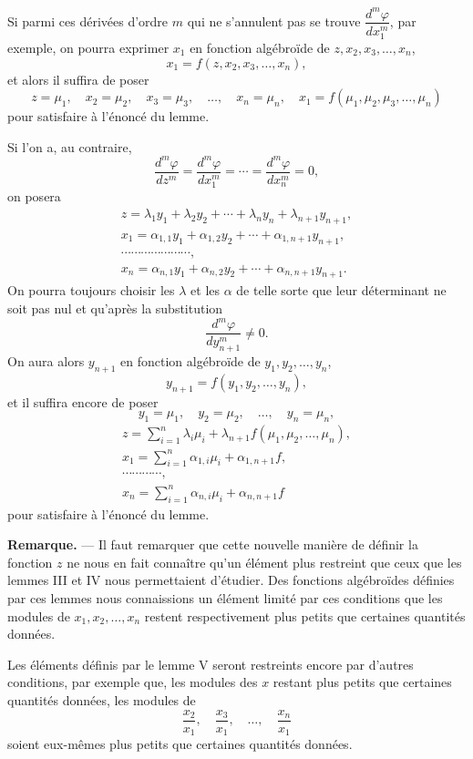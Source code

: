 \documentclass[11pt]{article}
\begin{document}
Si parmi ces dérivées d'ordre $m$ qui ne s'annulent pas se trouve $\dfrac{d^m\varphi}{dx_1^m}$, par exemple, on pourra exprimer $x_1$ en fonction algébroïde de $z,x_2,x_3,\ldots,x_n$,
\[
x_1=f(z,x_2,x_3,\ldots,x_n),
\]
et alors il suffira de poser
\[
z=\mu_1,
\quad x_2=\mu_2,
\quad x_3=\mu_3,
\quad \ldots,
\quad x_n=\mu_n,
\quad x_1=f(\mu_1,\mu_2,\mu_3,\ldots,\mu_n)
\]
pour satisfaire à l'énoncé du lemme.

Si l'on a, au contraire,
\[
\frac{d^m\varphi}{dz^m}=\frac{d^m\varphi}{dx_1^m}=\cdots=\frac{d^m\varphi}{dx_n^m}=0,
\]
on posera
\[
\begin{gathered}
z=\lambda_1y_1+\lambda_2y_2+\cdots+\lambda_ny_n+\lambda_{n+1}y_{n+1},\\
x_1=\alpha_{1,1}y_1+\alpha_{1,2}y_2+\cdots+\alpha_{1,n+1}y_{n+1},\\
\cdots\cdots\cdots\cdots\cdots\cdots\cdots,\\
x_n=\alpha_{n,1}y_1+\alpha_{n,2}y_2+\cdots+\alpha_{n,n+1}y_{n+1}.
\end{gathered}
\]
On pourra toujours choisir les $\lambda$ et les $\alpha$ de telle sorte que leur déterminant ne soit pas nul et qu'après la substitution
\[
\frac{d^m\varphi}{dy_{n+1}^m}\ne0.
\]
On aura alors $y_{n+1}$ en fonction algébroïde de $y_1,y_2,\ldots,y_n$,
\[
y_{n+1}=f(y_1,y_2,\ldots,y_n),
\]
et il suffira encore de poser
\[
y_1=\mu_1,
\quad y_2=\mu_2,
\quad \ldots,
\quad y_n=\mu_n,
\]
\[
\begin{gathered}
z=\sum_{i=1}^{n}\lambda_i\mu_i+\lambda_{n+1}f(\mu_1,\mu_2,\ldots,\mu_n),\\
x_1=\sum_{i=1}^{n}\alpha_{1,i}\mu_i+\alpha_{1,n+1}f,\\
\cdots\cdots\cdots\cdots,\\
x_n=\sum_{i=1}^{n}\alpha_{n,i}\mu_i+\alpha_{n,n+1}f
\end{gathered}
\]
pour satisfaire à l'énoncé du lemme.

\medskip
\noindent\textbf{Remarque.} — Il faut remarquer que cette nouvelle manière de définir la fonction $z$ ne nous en fait connaître qu'un élément plus restreint que ceux que les lemmes III et IV nous permettaient d'étudier. Des fonctions algébroïdes définies par ces lemmes nous connaissions un élément limité par ces conditions que les modules de $x_1,x_2,\ldots,x_n$ restent respectivement plus petits que certaines quantités données.

Les éléments définis par le lemme V seront restreints encore par d'autres conditions, par exemple que, les modules des $x$ restant plus petits que certaines quantités données, les modules de
\[
\frac{x_2}{x_1},\quad \frac{x_3}{x_1},\quad \ldots,
\quad \frac{x_n}{x_1}
\]
soient eux-mêmes plus petits que certaines quantités données.
\end{document}
